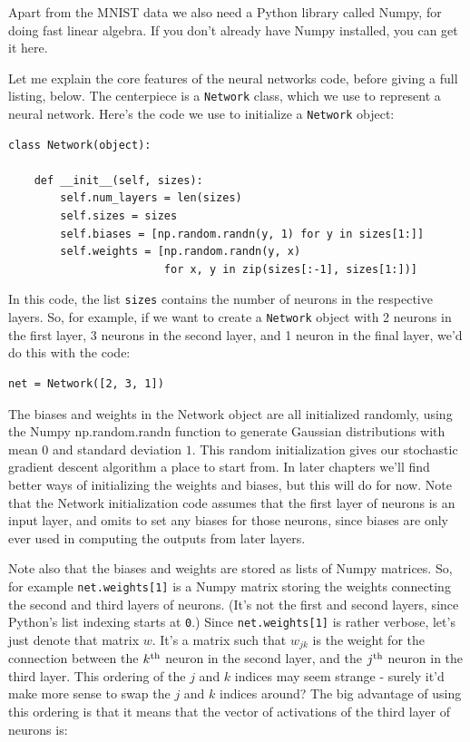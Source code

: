 Apart from the MNIST data we also need a Python library called Numpy, for doing fast linear algebra. If you don't already have Numpy installed, you can get it here.


Let me explain the core features of the neural networks code, before giving a full listing, below. The centerpiece is a \texttt{Network} class, which we use to represent a neural network. Here's the code we use to initialize a \texttt{Network} object:



\begin{lstlisting}
class Network(object):

    def __init__(self, sizes):
        self.num_layers = len(sizes)
        self.sizes = sizes
        self.biases = [np.random.randn(y, 1) for y in sizes[1:]]
        self.weights = [np.random.randn(y, x) 
                        for x, y in zip(sizes[:-1], sizes[1:])]

\end{lstlisting}


In this code, the list \texttt{sizes} contains the number of neurons in the respective layers. So, for example, if we want to create a \texttt{Network} object with 2 neurons in the first layer, 3 neurons in the second layer, and 1 neuron in the final layer, we'd do this with the code:



\begin{lstlisting}
net = Network([2, 3, 1])

\end{lstlisting}


The biases and weights in the Network object are all initialized randomly, using the Numpy np.random.randn function to generate Gaussian distributions with mean $0$ and standard deviation $1$. This random initialization gives our stochastic gradient descent algorithm a place to start from. In later chapters we'll find better ways of initializing the weights and biases, but this will do for now. Note that the Network initialization code assumes that the first layer of neurons is an input layer, and omits to set any biases for those neurons, since biases are only ever used in computing the outputs from later layers.


Note also that the biases and weights are stored as lists of Numpy matrices. So, for example \texttt{net.weights[1]} is a Numpy matrix storing the weights connecting the second and third layers of neurons. (It's not the first and second layers, since Python's list indexing starts at \texttt{0}.) Since \texttt{net.weights[1]} is rather verbose, let's just denote that matrix $w$. It's a matrix such that $w_{jk}$ is the weight for the connection between the $k^{\rm th}$ neuron in the second layer, and the $j^{\rm th}$ neuron in the third layer. This ordering of the $j$ and $k$ indices may seem strange - surely it'd make more sense to swap the $j$ and $k$ indices around? The big advantage of using this ordering is that it means that the vector of activations of the third layer of neurons is:

